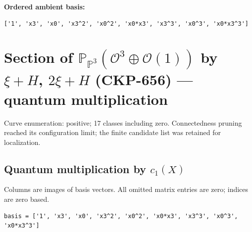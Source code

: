 \documentclass[10pt,a4paper]{article}
\begin{document}
\textbf{Ordered ambient basis:}
\begin{lstlisting}
['1', 'x3', 'x0', 'x3^2', 'x0^2', 'x0*x3', 'x3^3', 'x0^3', 'x0*x3^3']
\end{lstlisting}

\clearpage\section*{Section of $\mathbb P_{\mathbb P^{3}}(\mathcal O^{3}\oplus \mathcal O(1))$ by $\xi +H$, $2\xi +H$ (CKP-656) --- quantum multiplication}

Curve enumeration: positive; 17 classes including zero.
Connectedness pruning reached its configuration limit; the finite candidate list was retained for localization.
\subsection*{Quantum multiplication by $c_1(X)$}
Columns are images of basis vectors. All omitted matrix entries are zero; indices are zero based.

\begin{lstlisting}
basis = ['1', 'x3', 'x0', 'x3^2', 'x0^2', 'x0*x3', 'x3^3', 'x0^3', 'x0*x3^3']
\end{lstlisting}
\end{document}
